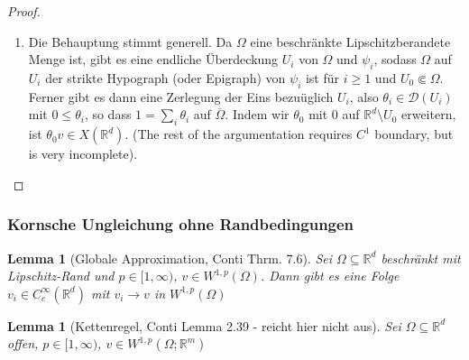 \documentclass{scrartcl}
\newcounter{everything}
\newtheorem{lemma}[everything]{Lemma}
\def\R{\mathbb{R}}
\newcommand{\cD}{\mathcal{D}}
\begin{document}
\begin{proof}
\begin{enumerate}
	
	
	
	\item Die Behauptung stimmt generell.
	Da $\Omega$ eine beschränkte Lipschitzberandete Menge ist, gibt es eine endliche Überdeckung $U_i$ von $\Omega$ und $\psi_i$, sodass $\Omega$ auf $U_i$ der strikte Hypograph (oder Epigraph) von $\psi_i$ ist für $i\geq1$ und $U_0\Subset\Omega$. Ferner gibt es dann eine Zerlegung der Eins bezuüglich $U_i$, also $\theta_i\in \cD(U_i)$ mit $0\leq\theta_i$, so dass $1=\sum_i\theta_i$ auf $\overline{\Omega}$. Indem wir $\theta_0$ mit $0$ auf $\R^d\setminus U_0$ erweitern, ist $\theta_0v\in X(\R^d)$. (The rest of the argumentation requires $C^1$ boundary, but is very incomplete).
	\end{enumerate}
\end{proof}

\subsubsection*{Kornsche Ungleichung ohne Randbedingungen}

\begin{lemma}[Globale Approximation, Conti Thrm. 7.6]
	Sei $\Omega\subseteq\R^d$ beschränkt mit Lipschitz-Rand und $p\in[1,\infty)$, $v\in W^{1,p}(\Omega)$. Dann gibt es eine Folge $v_i\in C_c^\infty(\R^d)$ mit $v_i\to v$ in $W^{1,p}(\Omega)$
\end{lemma}

\begin{lemma}[Kettenregel, Conti Lemma 2.39 - reicht hier nicht aus]
	Sei $\Omega\subseteq\R^d$ offen, $p\in[1,\infty)$, $v\in W^{1,p}(\Omega;\R^m)$
\end{lemma}
\end{document}
